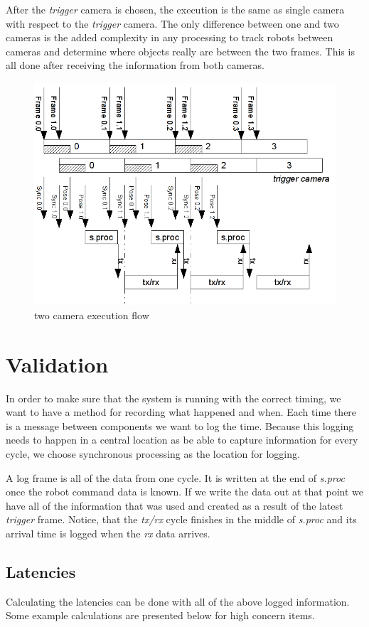\documentclass[letterpaper]{llncs}
\begin{document}
\pagebreak

After the \textit{trigger} camera is chosen, the execution is the same as single camera with respect to the \textit{trigger} camera. The only difference between one and two cameras is the added complexity in any processing to track robots between cameras and determine where objects really are between the two frames. This is all done after receiving the information from both cameras.

\begin{figure}[h]
	\centering
	\includegraphics[width=.75\textwidth]{images/two_camera.png}
	\caption{two camera execution flow}
	\label{twocamera}
\end{figure}

\section{Validation}
In order to make sure that the system is running with the correct timing, we want to have a method for recording what happened and when. Each time there is a message between components we want to log the time. Because this logging needs to happen in a central location as be able to capture information for every cycle, we choose synchronous processing as the location for logging.

A log frame is all of the data from one cycle. It is written at the end of \textit{s.proc} once the robot command data is known. If we write the data out at that point we have all of the information that was used and created as a result of the latest \textit{trigger} frame. Notice, that the \textit{tx/rx} cycle finishes in the middle of \textit{s.proc} and its arrival time is logged when the \textit{rx} data arrives.

\subsection{Latencies}
Calculating the latencies can be done with all of the above logged information. Some example calculations are presented below for high concern items.
\end{document}
